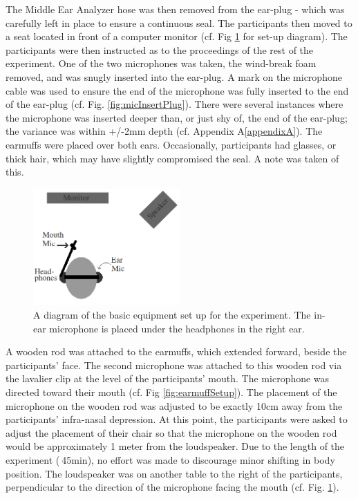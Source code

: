 The Middle Ear Analyzer hose was then removed from the ear-plug - which was carefully left in place to ensure a continuous seal.  The participants then moved to a seat located in front of a computer monitor (cf. Fig \ref{fig:overallSetUp} for set-up diagram).  The participants were then instructed as to the proceedings of the rest of the experiment. One of the two microphones was taken, the wind-break foam removed, and was snugly inserted into the ear-plug.  A mark on the microphone cable was used to ensure the end of the microphone was fully inserted to the end of the ear-plug (cf. Fig. \ref{fig:micInsertPlug}).  There were several instances where the microphone was inserted deeper than, or just shy of, the end of the ear-plug; the variance was within +/-2mm depth (cf. Appendix A\ref{appendixA}).  The earmuffs were placed over both ears.  Occasionally, participants had glasses, or thick hair, which may have slightly compromised the seal.  A note was taken of this. 

\begin{figure}
\includegraphics[width=0.5\textwidth]{figure/overallSetUp.png}
\caption{A diagram of the basic equipment set up for the experiment.  The in-ear microphone is placed under the headphones in the right ear.}
\label{fig:overallSetUp}
\end{figure}

A wooden rod was attached to the earmuffs, which extended forward, beside the participants' face.  The second microphone was attached to this wooden rod via the lavalier clip at the level of the participants' mouth.  The microphone was directed toward their mouth (cf. Fig \ref{fig:earmuffSetup}).  
The placement of the microphone on the wooden rod was adjusted to be exactly 10cm away from the participants' infra-nasal depression.  At this point, the participants were asked to adjust the placement of their chair so that the microphone on the wooden rod would be approximately 1 meter from the loudspeaker. Due to the length of the experiment ($~$45min), no effort was made to discourage minor shifting in body position.  The loudspeaker was on another table to the right of the participants, perpendicular to the direction of the microphone facing the mouth (cf. Fig. \ref{fig:overallSetUp}).

